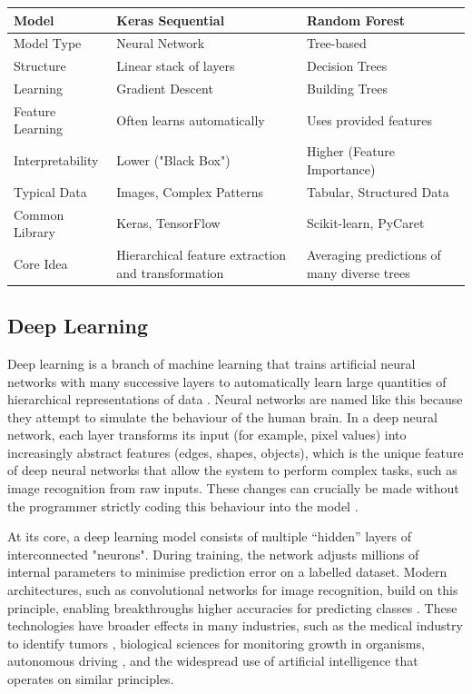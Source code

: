 \begin{tabular}{@{}l p{} p{}@{}} 
\toprule
\textbf{Model} & \textbf{Keras Sequential} & \textbf{Random Forest} \\
\midrule
Model Type & Neural Network & Tree-based \\
Structure & Linear stack of layers & Decision Trees \\
Learning & Gradient Descent & Building Trees \\
Feature Learning & Often learns automatically & Uses provided features \\
Interpretability & Lower ("Black Box") & Higher (Feature Importance) \\
Typical Data & Images, Complex Patterns & Tabular, Structured Data \\
Common Library & Keras, TensorFlow & Scikit-learn, PyCaret \\
Core Idea & Hierarchical feature extraction and transformation & Averaging predictions of many diverse trees \\
\bottomrule
\end{tabular}

\subsection{Deep Learning}
Deep learning is a branch of machine learning that trains artificial neural networks with many successive layers to automatically learn large quantities of hierarchical representations of data \citep{nsoft_vision_2023}. Neural networks are named like this because they attempt to simulate the behaviour of the human brain. In a deep neural network, each layer transforms its input (for example, pixel values) into increasingly abstract features (edges, shapes, objects), which is the unique feature of deep neural networks that allow the system to perform complex tasks, such as image recognition from raw inputs. These changes can crucially be made without the programmer strictly coding this behaviour into the model \citep{holdsworth_scapicchio_2024}. 

At its core, a deep learning model consists of multiple “hidden” layers of interconnected "neurons". During training, the network adjusts millions of internal parameters to minimise prediction error on a labelled dataset. Modern architectures, such as convolutional networks for image recognition, build on this principle, enabling breakthroughs higher accuracies for predicting classes \citep{goodfellow_bengio_courville_2016}. These technologies have broader effects in many industries, such as the medical industry to identify tumors \citep{oróstica_mardones_bernal_molina_orchard_verdugo_carvajalhausdorf_marcelain_contreras_armisen_2025}, biological sciences for monitoring growth in organisms, autonomous driving \citep{barla_2021}, and the widespread use of artificial intelligence that operates on similar principles. 

